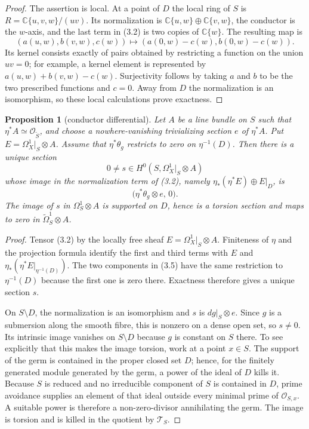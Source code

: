 \documentclass[11pt]{amsart}
\newcommand{\C}{\mathbb C}
\newcommand{\cO}{\mathcal O}
\theoremstyle{plain}
\newtheorem{proposition}[theorem]{Proposition}
\theoremstyle{definition}
\theoremstyle{remark}
\begin{document}
\begin{proof}
The assertion is local.  At a point of $D$ the local ring of $S$ is
\(R=\C\{u,v,w\}/(uv)\).  Its normalization is
\(\C\{u,w\}\oplus\C\{v,w\}\), the conductor is the $w$-axis, and the
last term in (3.2) is two copies of $\C\{w\}$.  The resulting map is
\[
 (a(u,w),b(v,w),c(w))\longmapsto
 (a(0,w)-c(w),b(0,w)-c(w)).
 \tag{3.3}
\]
Its kernel consists exactly of pairs obtained by restricting a function on
the union $uv=0$; for example, a kernel element is represented by
$a(u,w)+b(v,w)-c(w)$.  Surjectivity follows by taking $a$ and $b$ to be
the two prescribed functions and $c=0$.  Away from $D$ the normalization is
an isomorphism, so these local calculations prove exactness.
\end{proof}

\begin{proposition}[conductor differential]
\label{prop:conductor-differential}
Let $A$ be a line bundle on $S$ such that $\eta^*A\simeq\cO_{\widetilde S}$,
and choose a nowhere-vanishing trivializing section $e$ of $\eta^*A$.
Put $E=\Omega^1_X|_S\otimes A$.  Assume that $\eta^*\theta_g$ restricts to
zero on $\eta^{-1}(D)$.  Then there is a unique section
\[
 0\ne s\in H^0(S,\Omega^1_X|_S\otimes A)
 \tag{3.4}
\]
whose image in the normalization term of (3.2), namely
$\eta_*(\eta^*E)\oplus E|_D$, is
\[
  \bigl(\eta^*\theta_g\otimes e,\,0\bigr).
 \tag{3.5}
\]
The image of $s$ in $\Omega^1_S\otimes A$ is supported on $D$, hence is a
torsion section and maps to zero in $\widetilde\Omega^1_S\otimes A$.
\end{proposition}

\begin{proof}
Tensor (3.2) by the locally free sheaf
$E=\Omega^1_X|_S\otimes A$.  Finiteness of $\eta$ and the projection formula
identify the first and third terms with $E$ and
$\eta_*(\eta^*E|_{\eta^{-1}(D)})$.  The two components in (3.5) have the
same restriction to $\eta^{-1}(D)$ because the first one is zero there.
Exactness therefore gives a unique section $s$.

On $S\setminus D$, the normalization is an isomorphism and $s$ is
$dg|_S\otimes e$.  Since $g$ is a submersion along the smooth fibre, this is
nonzero on a dense open set, so $s\ne0$.  Its intrinsic image vanishes on
$S\setminus D$ because $g$ is constant on $S$ there.  To see explicitly that
this makes the image torsion, work at a point $x\in S$.  The support of the
germ is contained in the proper closed set $D$; hence, for the finitely
generated module generated by the germ, a power of the ideal of $D$ kills it.
Because $S$ is reduced and no irreducible component of $S$ is contained in
$D$, prime avoidance supplies an element of that ideal outside every minimal
prime of $\mathcal O_{S,x}$.  A suitable power is therefore a non-zero-divisor
annihilating the germ.  The image is torsion and is killed in the quotient by
$\mathscr T_S$.
\end{proof}
\end{document}
